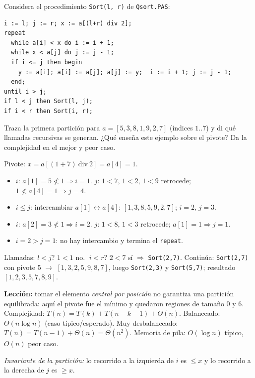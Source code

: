 \begin{prob}
Considera el procedimiento \texttt{Sort(l, r)} de \texttt{Qsort.PAS}:
\begin{lstlisting}
i := l; j := r; x := a[(l+r) div 2];
repeat
  while a[i] < x do i := i + 1;
  while x < a[j] do j := j - 1;
  if i <= j then begin
    y := a[i]; a[i] := a[j]; a[j] := y;  i := i + 1; j := j - 1;
  end;
until i > j;
if l < j then Sort(l, j);
if i < r then Sort(i, r);
\end{lstlisting}
Traza la primera partición para $a=[5,3,8,1,9,2,7]$ (índices $1..7$) y di qué llamadas recursivas se generan. ¿Qué enseña este ejemplo sobre el pivote? Da la complejidad en el mejor y peor caso.
\end{prob}
\begin{sol}
Pivote: $x=a[(1+7)\ \mathrm{div}\ 2]=a[4]=1$.
\begin{itemize}
\item $i$: $a[1]=5\not<1\Rightarrow i=1$. \quad $j$: $1<7,\,1<2,\,1<9$ retrocede; $1\not<a[4]=1\Rightarrow j=4$.
\item $i\le j$: intercambiar $a[1]\leftrightarrow a[4]$: $[1,3,8,5,9,2,7]$; $i=2$, $j=3$.
\item $i$: $a[2]=3\not<1\Rightarrow i=2$. \quad $j$: $1<8$, $1<3$ retrocede; $a[1]=1\Rightarrow j=1$.
\item $i=2>j=1$: no hay intercambio y termina el \texttt{repeat}.
\end{itemize}
Llamadas: $l<j$? $1<1$ no. $\;i<r$? $2<7$ sí $\Rightarrow$ \texttt{Sort(2,7)}. Continúa: \texttt{Sort(2,7)} con pivote 5 $\to$ $[1,3,2,5,9,8,7]$, luego \texttt{Sort(2,3)} y \texttt{Sort(5,7)}; resultado $[1,2,3,5,7,8,9]$.

\textbf{Lección:} tomar el elemento \emph{central por posición} no garantiza una partición equilibrada: aquí el pivote fue el mínimo y quedaron regiones de tamaño 0 y 6. Complejidad: $T(n)=T(k)+T(n-k-1)+\Theta(n)$. Balanceado: $\Theta(n\log n)$ (caso típico/esperado). Muy desbalanceado: $T(n)=T(n-1)+\Theta(n)=\Theta(n^2)$. Memoria de pila: $O(\log n)$ típico, $O(n)$ peor caso.

\emph{Invariante de la partición:} lo recorrido a la izquierda de $i$ es $\le x$ y lo recorrido a la derecha de $j$ es $\ge x$.
\end{sol}

